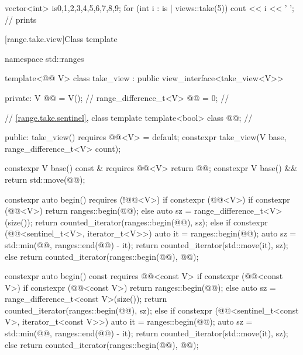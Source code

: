 \pnum
\begin{example}
\begin{codeblock}
vector<int> is{0,1,2,3,4,5,6,7,8,9};
for (int i : is | views::take(5))
  cout << i << ' '; // prints 
\end{codeblock}
\end{example}

[range.take.view]{Class template }

%
%
%
%
%
\begin{codeblock}
namespace std::ranges {
  template<@@ V>
  class take_view : public view_interface<take_view<V>> {
  private:
    V @@ = V();                                      // \expos
    range_difference_t<V> @@ = 0;                   // \expos

    // \ref{range.take.sentinel}, class template 
    template<bool> class @@;                      // \expos

  public:
    take_view() requires @@<V> = default;
    constexpr take_view(V base, range_difference_t<V> count);

    constexpr V base() const & requires @@<V> { return @@; }
    constexpr V base() && { return std::move(@@); }

    constexpr auto begin() requires (!@@<V>) {
      if constexpr (@@<V>) {
        if constexpr (@@<V>) {
          return ranges::begin(@@);
        } else {
          auto sz = range_difference_t<V>(size());
          return counted_iterator(ranges::begin(@@), sz);
        }
      } else if constexpr (@@<sentinel_t<V>, iterator_t<V>>) {
        auto it = ranges::begin(@@);
        auto sz = std::min(@@, ranges::end(@@) - it);
        return counted_iterator(std::move(it), sz);
      } else {
        return counted_iterator(ranges::begin(@@), @@);
      }
    }

    constexpr auto begin() const requires @@<const V> {
      if constexpr (@@<const V>) {
        if constexpr (@@<const V>) {
          return ranges::begin(@@);
        } else {
          auto sz = range_difference_t<const V>(size());
          return counted_iterator(ranges::begin(@@), sz);
        }
      } else if constexpr (@@<sentinel_t<const V>, iterator_t<const V>>) {
        auto it = ranges::begin(@@);
        auto sz = std::min(@@, ranges::end(@@) - it);
        return counted_iterator(std::move(it), sz);
      } else {
        return counted_iterator(ranges::begin(@@), @@);
      }
    }

}}
\end{codeblock}

